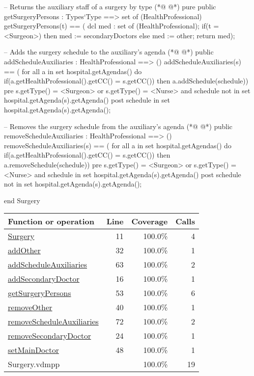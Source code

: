 \begin{vdmpp}[breaklines=true]
 -- Returns the auxiliary staff of a surgery by type
(*@
\label{getSurgeryPersons:53}
@*)
 pure public getSurgeryPersons : Types`Type ==> set of (HealthProfessional)
  getSurgeryPersons(t) == (
               dcl med : set of (HealthProfessional);
               if(t = <Surgeon>)
                then med := secondaryDoctors
               else
                med := other;
               return med);
 
 -- Adds the surgery schedule to the auxiliary's agenda            
(*@
\label{addScheduleAuxiliaries:63}
@*)
 public addScheduleAuxiliaries : HealthProfessional ==> ()
  addScheduleAuxiliaries(s) == (
   for all a in set hospital.getAgendas() do
    if(a.getHealthProfessional().getCC() = s.getCC())
     then a.addSchedule(schedule))
 pre s.getType() = <Surgeon> or s.getType() = <Nurse> and schedule not in set hospital.getAgenda(s).getAgenda()
 post schedule in set hospital.getAgenda(s).getAgenda();
 
 -- Removes the surgery schedule from the auxiliary's agenda
(*@
\label{removeScheduleAuxiliaries:72}
@*)
 public removeScheduleAuxiliaries : HealthProfessional ==> ()
  removeScheduleAuxiliaries(s) == (
   for all a in set hospital.getAgendas() do
    if(a.getHealthProfessional().getCC() = s.getCC())
     then a.removeSchedule(schedule))
 pre s.getType() = <Surgeon> or s.getType() = <Nurse> and schedule in set hospital.getAgenda(s).getAgenda()
 post schedule not in set hospital.getAgenda(s).getAgenda();
 
end Surgery
\end{vdmpp}
\bigskip
\begin{longtable}{|l|r|r|r|}
\hline
Function or operation & Line & Coverage & Calls \\
\hline
\hline
\hyperref[Surgery:11]{Surgery} & 11&100.0\% & 4 \\
\hline
\hyperref[addOther:32]{addOther} & 32&100.0\% & 1 \\
\hline
\hyperref[addScheduleAuxiliaries:63]{addScheduleAuxiliaries} & 63&100.0\% & 2 \\
\hline
\hyperref[addSecondaryDoctor:16]{addSecondaryDoctor} & 16&100.0\% & 1 \\
\hline
\hyperref[getSurgeryPersons:53]{getSurgeryPersons} & 53&100.0\% & 6 \\
\hline
\hyperref[removeOther:40]{removeOther} & 40&100.0\% & 1 \\
\hline
\hyperref[removeScheduleAuxiliaries:72]{removeScheduleAuxiliaries} & 72&100.0\% & 2 \\
\hline
\hyperref[removeSecondaryDoctor:24]{removeSecondaryDoctor} & 24&100.0\% & 1 \\
\hline
\hyperref[setMainDoctor:48]{setMainDoctor} & 48&100.0\% & 1 \\
\hline
\hline
Surgery.vdmpp & & 100.0\% & 19 \\
\hline
\end{longtable}

